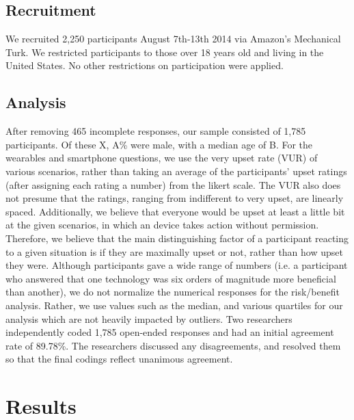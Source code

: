 \documentclass{acm_proc_article-sp}
\begin{document}
\subsection{Recruitment}
We recruited 2,250 participants August 7th-13th 2014 via Amazon's Mechanical Turk. We restricted participants to those over 18 years old and living in the United States. No other restrictions on participation were applied. 

\subsection{Analysis}
After removing 465 incomplete responses, our sample consisted of 1,785 participants. Of these X, A\% were male, with a median age of B. For the wearables and smartphone questions, we use the very upset rate (VUR) of various scenarios, rather than taking an average of the participants' upset ratings (after assigning each rating a number) from the likert scale. The VUR also does not presume that the ratings, ranging from indifferent to very upset, are linearly spaced. Additionally, we believe that everyone would be upset at least a little bit at the given scenarios, in which an device takes action without permission. Therefore, we believe that the main distinguishing factor of a participant reacting to a given situation is if they are maximally upset or not, rather than how upset they were. Although participants gave a wide range of numbers (i.e. a participant who answered that one technology was six orders of magnitude more beneficial than another), we do not normalize the numerical responses for the risk/benefit analysis. Rather, we use values such as the median, and various quartiles for our analysis which are not heavily impacted by outliers. Two researchers independently coded 1,785 open-ended responses and had an initial agreement rate of 89.78\%. The researchers discussed any disagreements, and resolved them so that the final codings reflect unanimous agreement.


\section{Results}
\end{document}
